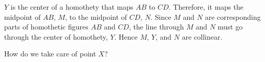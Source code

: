 








$Y$ is the center of a homothety that maps $AB$ to $CD$. Therefore, it maps the midpoint of $AB$, $M$, to the midpoint of $CD$, $N$. Since $M$ and $N$ are corresponding parts of homothetic figures $AB$ and $CD$, the line through $M$ and $N$ must go through the center of homothety, $Y$. Hence $M$, $Y$, and $N$ are collinear.

How do we take care of point $X$?






